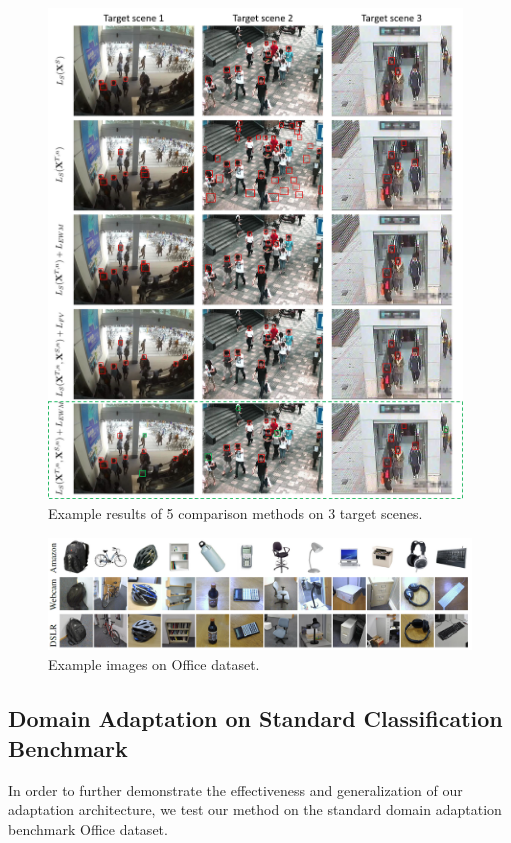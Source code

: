 \documentclass[runningheads]{llncs}
\begin{document}
\begin{figure}
\centering
\includegraphics[height=13cm]{images/detectionresult.jpg}
\caption{Example results of 5 comparison methods on 3 target scenes.}
\label{fig:detectionresult}
\end{figure}

\begin{figure}
\centering
\includegraphics[height=3cm]{images/officeimages.png}
\caption{Example images on Office dataset.}
\label{fig:officeimages}
\end{figure}


\subsection{Domain Adaptation on Standard Classification Benchmark}

In order to further demonstrate the effectiveness and generalization of our adaptation architecture, we test our method on the standard domain adaptation benchmark Office dataset\cite{saenko2010adapting}.
\end{document}
